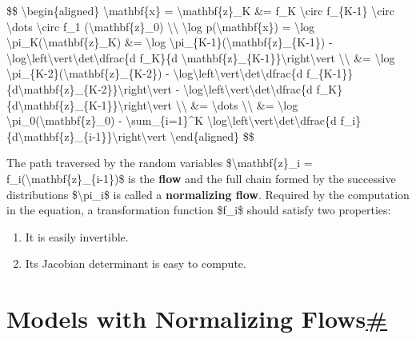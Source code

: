 \$\$ \textbackslash begin\{aligned\} \textbackslash mathbf\{x\} = \textbackslash mathbf\{z\}\_K \&= f\_K \textbackslash circ f\_\{K-1\} \textbackslash circ \textbackslash dots \textbackslash circ f\_1 (\textbackslash mathbf\{z\}\_0) \textbackslash\textbackslash{} \textbackslash log p(\textbackslash mathbf\{x\}) = \textbackslash log \textbackslash pi\_K(\textbackslash mathbf\{z\}\_K) \&= \textbackslash log \textbackslash pi\_\{K-1\}(\textbackslash mathbf\{z\}\_\{K-1\}) - \textbackslash log\textbackslash left\textbackslash vert\textbackslash det\textbackslash dfrac\{d f\_K\}\{d \textbackslash mathbf\{z\}\_\{K-1\}\}\textbackslash right\textbackslash vert \textbackslash\textbackslash{} \&= \textbackslash log \textbackslash pi\_\{K-2\}(\textbackslash mathbf\{z\}\_\{K-2\}) - \textbackslash log\textbackslash left\textbackslash vert\textbackslash det\textbackslash dfrac\{d f\_\{K-1\}\}\{d\textbackslash mathbf\{z\}\_\{K-2\}\}\textbackslash right\textbackslash vert - \textbackslash log\textbackslash left\textbackslash vert\textbackslash det\textbackslash dfrac\{d f\_K\}\{d\textbackslash mathbf\{z\}\_\{K-1\}\}\textbackslash right\textbackslash vert \textbackslash\textbackslash{} \&= \textbackslash dots \textbackslash\textbackslash{} \&= \textbackslash log \textbackslash pi\_0(\textbackslash mathbf\{z\}\_0) - \textbackslash sum\_\{i=1\}\^{}K \textbackslash log\textbackslash left\textbackslash vert\textbackslash det\textbackslash dfrac\{d f\_i\}\{d\textbackslash mathbf\{z\}\_\{i-1\}\}\textbackslash right\textbackslash vert \textbackslash end\{aligned\} \$\$

The path traversed by the random variables \$\textbackslash mathbf\{z\}\_i = f\_i(\textbackslash mathbf\{z\}\_\{i-1\})\$ is the \textbf{flow} and the full chain formed by the successive distributions \$\textbackslash pi\_i\$ is called a \textbf{normalizing flow}. Required by the computation in the equation, a transformation function \$f\_i\$ should satisfy two properties:

\begin{enumerate}
\tightlist
\item
  It is easily invertible.
\item
  Its Jacobian determinant is easy to compute.
\end{enumerate}

\section{\texorpdfstring{Models with Normalizing Flows\hyperref[models-with-normalizing-flows]{\#}}{Models with Normalizing Flows\#}}\label{models-with-normalizing-flows}

